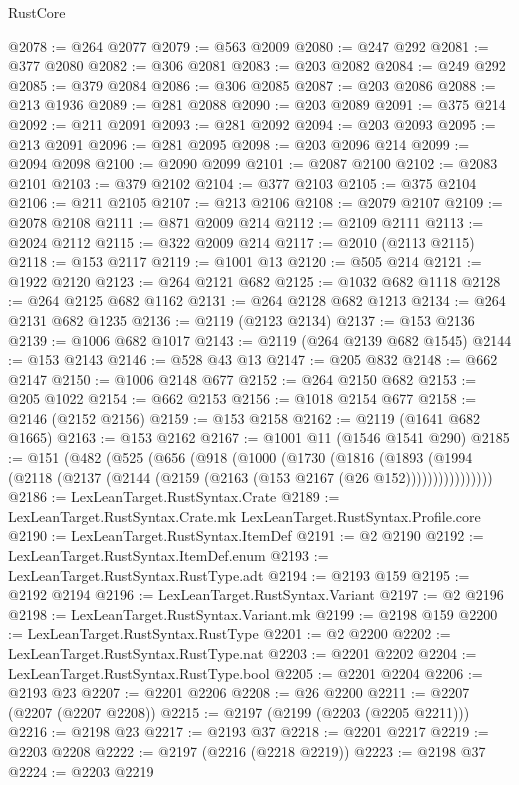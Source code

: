 \begin{lexlean}{RustCore}
\begin{coremodule}
@2078 := @264 @2077
@2079 := @563 @2009
@2080 := @247 @292
@2081 := @377 @2080
@2082 := @306 @2081
@2083 := @203 @2082
@2084 := @249 @292
@2085 := @379 @2084
@2086 := @306 @2085
@2087 := @203 @2086
@2088 := @213 @1936
@2089 := @281 @2088
@2090 := @203 @2089
@2091 := @375 @214
@2092 := @211 @2091
@2093 := @281 @2092
@2094 := @203 @2093
@2095 := @213 @2091
@2096 := @281 @2095
@2098 := @203 @2096 @214
@2099 := @2094 @2098
@2100 := @2090 @2099
@2101 := @2087 @2100
@2102 := @2083 @2101
@2103 := @379 @2102
@2104 := @377 @2103
@2105 := @375 @2104
@2106 := @211 @2105
@2107 := @213 @2106
@2108 := @2079 @2107
@2109 := @2078 @2108
@2111 := @871 @2009 @214
@2112 := @2109 @2111
@2113 := @2024 @2112
@2115 := @322 @2009 @214
@2117 := @2010 (@2113 @2115)
@2118 := @153 @2117
@2119 := @1001 @13
@2120 := @505 @214
@2121 := @1922 @2120
@2123 := @264 @2121 @682
@2125 := @1032 @682 @1118
@2128 := @264 @2125 @682 @1162
@2131 := @264 @2128 @682 @1213
@2134 := @264 @2131 @682 @1235
@2136 := @2119 (@2123 @2134)
@2137 := @153 @2136
@2139 := @1006 @682 @1017
@2143 := @2119 (@264 @2139 @682 @1545)
@2144 := @153 @2143
@2146 := @528 @43 @13
@2147 := @205 @832
@2148 := @662 @2147
@2150 := @1006 @2148 @677
@2152 := @264 @2150 @682
@2153 := @205 @1022
@2154 := @662 @2153
@2156 := @1018 @2154 @677
@2158 := @2146 (@2152 @2156)
@2159 := @153 @2158
@2162 := @2119 (@1641 @682 @1665)
@2163 := @153 @2162
@2167 := @1001 @11 (@1546 @1541 @290)
@2185 := @151
    (@482
      (@525
        (@656
          (@918
            (@1000
              (@1730
                (@1816
                  (@1893
                    (@1994 (@2118 (@2137 (@2144 (@2159 (@2163 (@153 @2167 (@26 @152))))))))))))))))
@2186 := LexLeanTarget.RustSyntax.Crate
@2189 := LexLeanTarget.RustSyntax.Crate.mk LexLeanTarget.RustSyntax.Profile.core
@2190 := LexLeanTarget.RustSyntax.ItemDef
@2191 := @2 @2190
@2192 := LexLeanTarget.RustSyntax.ItemDef.enum
@2193 := LexLeanTarget.RustSyntax.RustType.adt
@2194 := @2193 @159
@2195 := @2192 @2194
@2196 := LexLeanTarget.RustSyntax.Variant
@2197 := @2 @2196
@2198 := LexLeanTarget.RustSyntax.Variant.mk
@2199 := @2198 @159
@2200 := LexLeanTarget.RustSyntax.RustType
@2201 := @2 @2200
@2202 := LexLeanTarget.RustSyntax.RustType.nat
@2203 := @2201 @2202
@2204 := LexLeanTarget.RustSyntax.RustType.bool
@2205 := @2201 @2204
@2206 := @2193 @23
@2207 := @2201 @2206
@2208 := @26 @2200
@2211 := @2207 (@2207 (@2207 @2208))
@2215 := @2197 (@2199 (@2203 (@2205 @2211)))
@2216 := @2198 @23
@2217 := @2193 @37
@2218 := @2201 @2217
@2219 := @2203 @2208
@2222 := @2197 (@2216 (@2218 @2219))
@2223 := @2198 @37
@2224 := @2203 @2219

\end{coremodule}
\end{lexlean}
